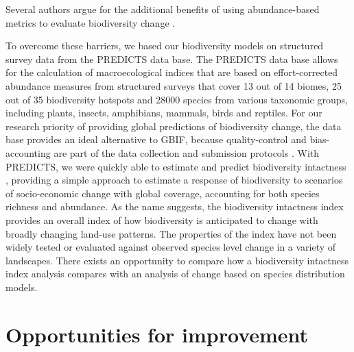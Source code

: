 Several authors argue for the additional benefits of using abundance-based metrics to evaluate biodiversity change \citep{scholes_biodiversity_2005, newbold_global_2015}.

To overcome these barriers, we based our biodiversity models on structured survey data from the PREDICTS data base. The PREDICTS data base allows for the calculation of macroecological indices that are based on effort-corrected abundance measures from structured surveys that cover 13 out of 14 biomes, 25 out of 35 biodiversity hotspots and 28000 species from various taxonomic groups, including plants, insects, amphibians, mammals, birds and reptiles. For our research priority of providing global predictions of biodiversity change, the data base provides an ideal alternative to GBIF, because quality-control and bias-accounting are part of the data collection and submission protocols \citep{hudson_predicts_2014}. With PREDICTS, we were quickly able to estimate and predict biodiversity intactness \citep{scholes_biodiversity_2005}, providing a simple approach to estimate a response of biodiversity to scenarios of socio-economic change with global coverage, accounting for both species richness and abundance. As the name suggests, the biodiversity intactness index provides an overall index of how biodiversity is anticipated to change with broadly changing land-use patterns.  The properties of the index have not been widely tested or evaluated against observed species level change in a variety of landscapes. There exists an opportunity to compare how a biodiversity intactness index analysis compares with an analysis of change based on species distribution models.

\section{Opportunities for improvement}

